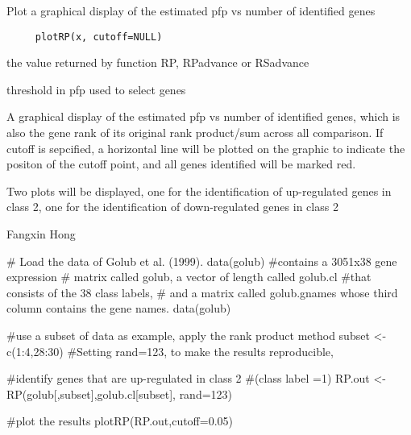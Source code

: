 \begin{Description}\relax
Plot a graphical display of the estimated pfp vs 
number of identified genes
\end{Description}
\begin{Usage}
\begin{verbatim}
     plotRP(x, cutoff=NULL)\end{verbatim}
\end{Usage}
\begin{Arguments}
\begin{ldescription}
\item[\code{x}] the value returned by function RP, 
RPadvance or RSadvance 
\item[\code{cutoff}] threshold in pfp used to select genes
\end{ldescription}
\end{Arguments}
\begin{Value}
A graphical display of the estimated pfp vs number of 
identified genes, which is also the gene rank of its 
original rank product/sum across all comparison. If cutoff 
is sepcified, a horizontal line will be plotted on the 
graphic to indicate the positon of the cutoff point, and 
all genes identified will be marked red.

Two plots will be displayed, one for the identification of 
up-regulated genes in class 2, one for the identification of 
down-regulated genes in class 2
\end{Value}
\begin{Author}\relax
Fangxin Hong 
\end{Author}
\begin{SeeAlso}\relax
{}     
 
\end{SeeAlso}
\begin{Examples}
\begin{ExampleCode}
     
      # Load the data of Golub et al. (1999). data(golub) 
      #contains a 3051x38 gene expression
      # matrix called golub, a vector of length called golub.cl 
      #that consists of the 38 class labels,
      # and a matrix called golub.gnames whose third column contains the gene names.
      data(golub)
 
      #use a subset of data as example, apply the rank product method
      subset <- c(1:4,28:30)
      #Setting rand=123, to make the results reproducible,

      #identify genes that are up-regulated in class 2 
      #(class label =1)
      RP.out <- RP(golub[,subset],golub.cl[subset], rand=123)
      
      #plot the results
      plotRP(RP.out,cutoff=0.05)
      
\end{ExampleCode}
\end{Examples}

